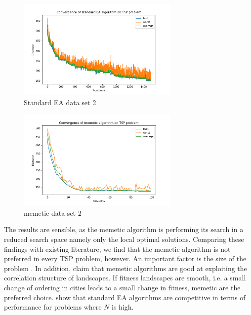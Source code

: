 \documentclass{article}
\begin{document}
\begin{enumerate}[label=\alph*)]
    
    \begin{figure}[H]
        \centering
        \includegraphics[width=0.7\textwidth]{Assignment 1/Figures/A1_6b1.png}
        \caption{Standard EA data set 2}
        \label{fig:A1_6c1}
    \end{figure}  
    \begin{figure}[H]
        \centering
        \includegraphics[width=0.7\textwidth]{Assignment 1/Figures/A1_6b2.png}
        \caption{memetic data set 2}
        \label{fig:A1_6c2}
    \end{figure}
    
    The results are sensible, as the memetic algorithm is performing its search in a reduced search space namely only the local optimal solutions.  Comparing these findings with existing literature, we find that the memetic algorithm is not preferred in every TSP problem, however. An important factor is the size of the problem  \cite{merz2001memetic}. In addition, \cite{merz2001memetic} claim that memetic algorithms are good at exploiting the correlation structure of landscapes. If fitness landscapes are smooth, i.e. a small change of ordering in cities leads to a small change in fitness, memetic are the preferred choice.
     show that standard EA algorithms are competitive in terms of performance for problems where $N$ is high. 
\end{enumerate}
\end{document}
